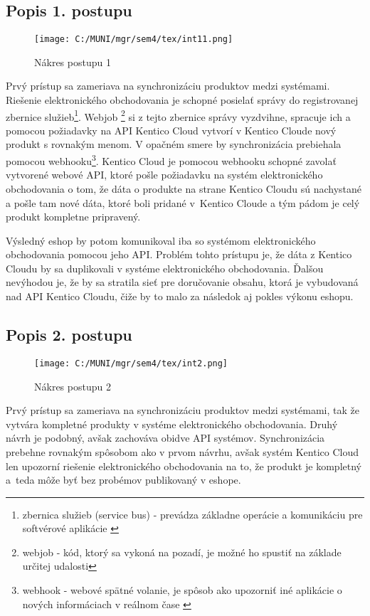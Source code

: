 \documentclass[
  printed, %
  table,   %
  lof,     %
  nolot,     %
  twoside,  
]{fithesis3}
\begin{document}
\subsection{Popis 1. postupu}
\begin{figure}[h]
  \begin{center}
        \texttt{[image: C:/MUNI/mgr/sem4/tex/int11.png]}
  \end{center}
  \caption{Nákres postupu 1}
  \label{fig:integraation1}
\end{figure}
Prvý prístup sa zameriava na synchronizáciu produktov medzi systémami. Riešenie elektronického obchodovania je schopné posielať správy do registrovanej zbernice služieb\footnote{zbernica služieb (service bus) - prevádza základne operácie a komunikáciu pre softvérové aplikácie \cite{sb}}. Webjob \footnote{webjob - kód, ktorý sa vykoná na pozadí, je možné ho spustiť na základe určitej udalosti} si z tejto zbernice správy vyzdvihne, spracuje ich a pomocou požiadavky na API Kentico Cloud vytvorí v Kentico Cloude nový produkt s rovnakým menom. V opačném smere by synchronizácia prebiehala pomocou webhooku\footnote{webhook - webové spätné volanie, je spôsob ako upozorniť iné aplikácie o nových informáciach v reálnom čase \cite{webhook}}. Kentico Cloud je pomocou webhooku  schopné zavolať vytvorené webové API, ktoré pošle požiadavku na systém elektronického obchodovania o tom, že dáta o produkte na strane Kentico Cloudu sú nachystané a pošle tam nové dáta, ktoré boli pridané v~Kentico Cloude a tým pádom je celý produkt kompletne pripravený.

Výsledný eshop by potom komunikoval iba so systémom elektronického obchodovania pomocou jeho API. Problém tohto prístupu je, že dáta z  Kentico Cloudu by sa duplikovali v systéme elektronického obchodovania. Ďalšou nevýhodou je, že by sa stratila sieť pre doručovanie obsahu, ktorá je vybudovaná nad API Kentico Cloudu, čiže by to malo za následok aj pokles výkonu eshopu. 

\subsection{Popis 2. postupu}
\begin{figure}[h]
  \begin{center}
        \texttt{[image: C:/MUNI/mgr/sem4/tex/int2.png]}
  \end{center}
  \caption{Nákres postupu 2}
  \label{fig:integration2}
\end{figure}
Prvý prístup sa zameriava na synchronizáciu produktov medzi systémami, tak že vytvára kompletné produkty v systéme elektronického obchodovania.  Druhý návrh je podobný, avšak zachováva obidve API systémov. Synchronizácia prebehne rovnakým spôsobom ako v prvom návrhu, avšak systém Kentico Cloud len upozorní riešenie elektronického obchodovania na to, že produkt je kompletný a~teda môže byť bez probémov publikovaný v eshope.
\end{document}

